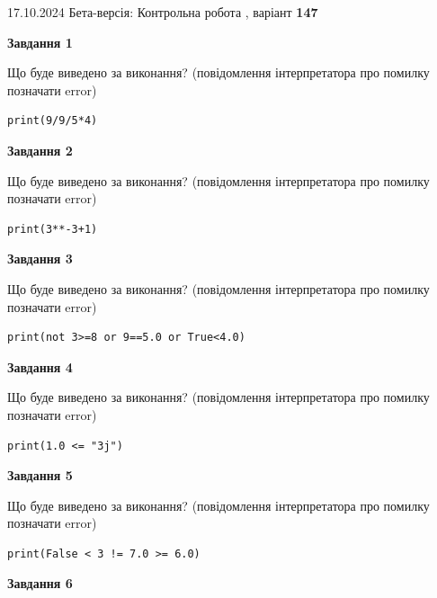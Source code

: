 \documentclass[12pt, ukrainian]{article}
\begin{document}
{\Large{17.10.2024 Бета-версія: Контрольна робота , варіант  \No \textbf { 147 }\par}}
{
\begin {large}
{\begin {center}\textbf{Завдання 1}\end {center}}

Що буде виведено за виконання? (повідомлення інтерпретатора про помилку позначати error)\par
\begin{verbatim}
print(9/9/5*4)
\end{verbatim}

{\begin {center}\textbf{Завдання 2}\end {center}}

Що буде виведено за виконання? (повідомлення інтерпретатора про помилку позначати error)\par
\begin{verbatim}
print(3**-3+1)
\end{verbatim}

{\begin {center}\textbf{Завдання 3}\end {center}}

Що буде виведено за виконання? (повідомлення інтерпретатора про помилку позначати error)\par
\begin{verbatim}
print(not 3>=8 or 9==5.0 or True<4.0)
\end{verbatim}

{\begin {center}\textbf{Завдання 4}\end {center}}

Що буде виведено за виконання? (повідомлення інтерпретатора про помилку позначати error)\par
\begin{verbatim}
print(1.0 <= "3j")
\end{verbatim}

{\begin {center}\textbf{Завдання 5}\end {center}}

Що буде виведено за виконання? (повідомлення інтерпретатора про помилку позначати error)\par
\begin{verbatim}
print(False < 3 != 7.0 >= 6.0)
\end{verbatim}

{\begin {center}\textbf{Завдання 6}\end {center}}


\end{large}}
\end{document}
